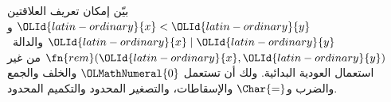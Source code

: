 \documentclass[../../../include/open-logic-section]{subfiles}
\begin{document}
\begin{prob}
  بيّن إمكان تعريف العلاقتين $\OLId{latin-ordinary}{x}<\OLId{latin-ordinary}{y}$ و$\OLId{latin-ordinary}{x}\mid \OLId{latin-ordinary}{y}$ والدالة~$\fn{rem}(\OLId{latin-ordinary}{x},\OLId{latin-ordinary}{y})$
  من غير استعمال العودية البدائية. ولك أن تستعمل $\OLMathNumeral{0}$ والخلف والجمع
  والضرب و$\Char{=}$ والإسقاطات، والتصغير المحدود والتكميم المحدود.
\end{prob}
\end{document}
